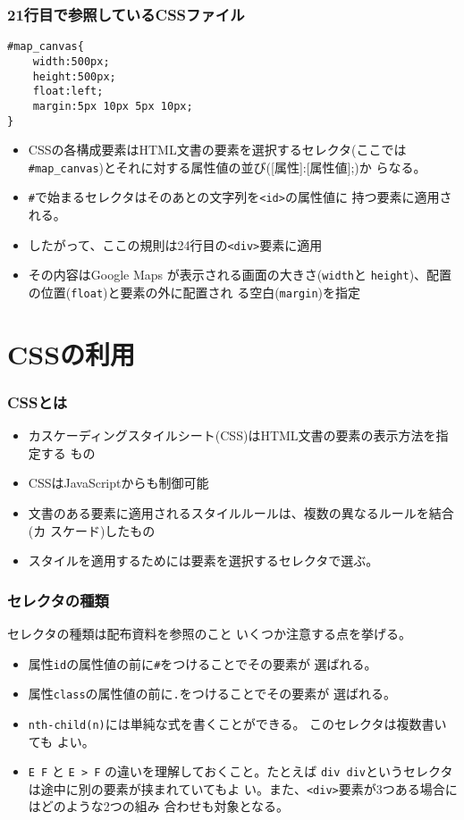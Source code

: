 \documentclass[dvipsk]{beamer}
\newcommand{\Elm}[1]{\texttt{<#1>}}
\begin{document}
\begin{frame}[containsverbatim]
 \frametitle{21行目で参照しているCSSファイル}
\begin{verbatim}
#map_canvas{
    width:500px;
    height:500px;
    float:left;
    margin:5px 10px 5px 10px;
}
\end{verbatim}
\begin{itemize}
 \item CSSの各構成要素はHTML文書の要素を選択するセレクタ(ここでは
       \verb+#map_canvas+)とそれに対する属性値の並び([属性]:[属性値];)か
       らなる。
 \item \verb+#+で始まるセレクタはそのあとの文字列を\Elm{id}の属性値に
       持つ要素に適用される。
 \item したがって、ここの規則は24行目の\Elm{div}要素に適用
 \item その内容はGoogle Maps が表示される画面の大きさ(\texttt{width}と
       \texttt{height})、配置の位置(\texttt{float})と要素の外に配置され
       る空白(\texttt{margin})を指定
\end{itemize}
\end{frame}
\section{CSSの利用}
\begin{frame}[containsverbatim]
 \frametitle{CSSとは}
\begin{itemize}
 \item カスケーディングスタイルシート(CSS)はHTML文書の要素の表示方法を指定する
もの
 \item CSSはJavaScriptからも制御可能
 \item 文書のある要素に適用されるスタイルルールは、複数の異なるルールを結合(カ
スケード)したもの
 \item スタイルを適用するためには要素を選択するセレクタで選ぶ。
\end{itemize}
\end{frame}
\begin{frame}[containsverbatim]
 \frametitle{セレクタの種類}
セレクタの種類は配布資料を参照のこと
いくつか注意する点を挙げる。
\begin{itemize}
 \item 属性\texttt{id}の属性値の前に\texttt{\#}をつけることでその要素が
       選ばれる。
 \item 属性\texttt{class}の属性値の前に\texttt{.}をつけることでその要素が
       選ばれる。
 \item \texttt{nth-child(n)}には単純な式を書くことができる。
このセレクタは複数書いても
       よい。
 \item \verb+E F+ と \verb+E > F+ の違いを理解しておくこと。たとえば
       \texttt{div div}というセレクタは途中に別の要素が挟まれていてもよ
       い。また、\texttt{<div>}要素が3つある場合にはどのような2つの組み
       合わせも対象となる。
\end{itemize}
\end{frame}
\end{document}
